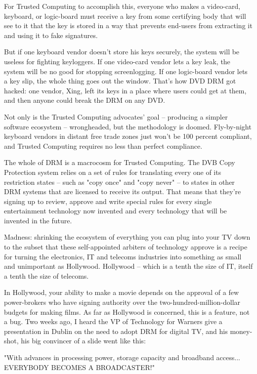 For Trusted Computing to accomplish this, everyone who makes a
video-card, keyboard, or logic-board must receive a key from some
certifying body that will see to it that the key is stored in a way
that prevents end-users from extracting it and using it to fake
signatures.

But if one keyboard vendor doesn't store his keys securely, the
system will be useless for fighting keyloggers. If one video-card
vendor lets a key leak, the system will be no good for stopping
screenlogging. If one logic-board vendor lets a key slip, the whole
thing goes out the window. That's how DVD DRM got hacked: one
vendor, Xing, left its keys in a place where users could get at
them, and then anyone could break the DRM on any DVD.

Not only is the Trusted Computing advocates' goal -- producing a
simpler software ecosystem -- wrongheaded, but the methodology is
doomed. Fly-by-night keyboard vendors in distant free trade zones
just won't be 100 percent compliant, and Trusted Computing requires
no less than perfect compliance.

The whole of DRM is a macrocosm for Trusted Computing. The DVB Copy
Protection system relies on a set of rules for translating every
one of its restriction states -- such as "copy once" and "copy
never" -- to states in other DRM systems that are licensed to
receive its output. That means that they're signing up to review,
approve and write special rules for every single entertainment
technology now invented and every technology that will be invented
in the future.

Madness: shrinking the ecosystem of everything you can plug into
your TV down to the subset that these self-appointed arbiters of
technology approve is a recipe for turning the electronics, IT and
telecoms industries into something as small and unimportant as
Hollywood. Hollywood -- which is a tenth the size of IT, itself a
tenth the size of telecoms.

In Hollywood, your ability to make a movie depends on the approval
of a few power-brokers who have signing authority over the
two-hundred-million-dollar budgets for making films. As far as
Hollywood is concerned, this is a feature, not a bug. Two weeks
ago, I heard the VP of Technology for Warners give a presentation
in Dublin on the need to adopt DRM for digital TV, and his
money-shot, his big convincer of a slide went like this:

"With advances in processing power, storage capacity and broadband
access... EVERYBODY BECOMES A BROADCASTER!"


